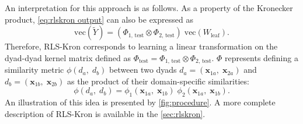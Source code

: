 \documentclass[sn-mathphys-num]{sn-jnl}%
\newcommand{\x}{\mathbf{x}}
\theoremstyle{thmstyleone}%
\theoremstyle{thmstyletwo}%
\theoremstyle{thmstylethree}%
\begin{document}
An interpretation for this approach is as follows. As a property of the Kronecker product, \autoref{eq:rlskron output} can also be expressed as
\begin{equation}
    \text{vec}(\tilde Y)
        = (\Phi_\text{1, test} \otimes \Phi_\text{2, test})
        \; \text{vec}(W_\text{leaf})
    \text{.}
\end{equation}
Therefore, RLS-Kron corresponds to learning a linear transformation on the dyad-dyad kernel matrix defined as $\Phi_\text{test} = \Phi_\text{1, test} \otimes \Phi_\text{2, test}$.
$\Phi$ represents defining a similarity metric $\phi(d_a,\;d_b)$ between two dyads $d_a=(\x_{1a},\;\x_{2a})$ and $d_b=(\x_{1b},\;\x_{2b})$ as the product of their domain-specific similarities:
\begin{equation}
    \phi(d_a,\;d_b) = \phi_1(\x_{1a},\; \x_{1b}) \; \phi_2(\x_{1a},\; \x_{1b})
    \text{.}
\end{equation}
%
An illustration of this idea is presented by \autoref{fig:procedure}. A more complete description of RLS-Kron is available in the \autoref{sec:rlskron}.
\end{document}
